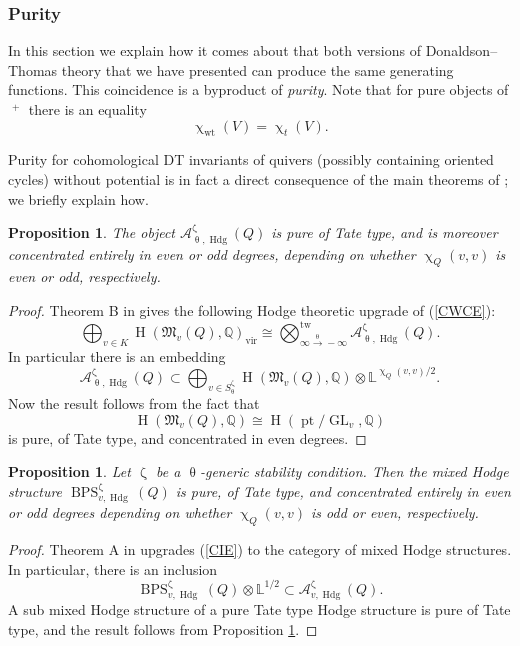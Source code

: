 \documentclass{amsart}
\DeclareMathOperator{\tw}{tw}
\DeclareMathOperator{\pt}{pt}
\newcommand{\Mst}{\mathfrak{M}}
\newcommand{\LL}{\mathbb{L}}
\newcommand{\QQ}{\mathbb{Q}}
\DeclareMathOperator{\Wt}{wt}
\DeclareMathOperator{\HO}{H}
\DeclareMathOperator{\mMHS}{\overline{MHS}}
\DeclareMathOperator{\BPS}{BPS}
\DeclareMathOperator{\vir}{vir}
\DeclareMathOperator{\GL}{GL}
\DeclareMathOperator{\Hodge}{Hdg}
\renewcommand{\theta}{\uptheta}
\renewcommand{\zeta}{\upzeta}
\renewcommand{\chi}{\upchi}
\theoremstyle{plain}%
\newtheorem{prop}[thm]{Proposition}
\theoremstyle{definition}
\theoremstyle{remark}
\begin{document}
\subsubsection{Purity}
In this section we explain how it comes about that both versions of Donaldson--Thomas theory that we have presented can produce the same generating functions.  This coincidence is a byproduct of \textit{purity}.  Note that for pure objects of $\mMHS^+$ there is an equality
\[
\chi_{\Wt}(V)=\chi_t(V).
\]

Purity for cohomological DT invariants of quivers (possibly containing oriented cycles) without potential is in fact a direct consequence of the main theorems of \cite{DavMei}; we briefly explain how.


\begin{prop}\label{Apurity}
The object $\mathcal{A}_{\theta,\Hodge}^{\zeta}(Q)$ is pure of Tate type, and is moreover concentrated entirely in even or odd degrees, depending on whether $\chi_Q(v,v)$ is even or odd, respectively.
\end{prop}
\begin{proof}
Theorem B in \cite{DavMei} gives the following Hodge theoretic upgrade of (\ref{CWCE}):
\[
\bigoplus_{v\in K}\HO(\Mst_v(Q),\QQ)_{\vir}\cong \bigotimes^{\tw}_{\infty \xrightarrow{\theta}-\infty}\mathcal{A}^{\zeta}_{\theta,\Hodge}(Q).
\]
In particular there is an embedding
\[
\mathcal{A}_{\theta,\Hodge}^{\zeta}(Q)\subset \bigoplus_{v\in S_{\theta}^{\zeta}}\HO(\Mst_v(Q),\QQ)\otimes \LL^{\chi_Q(v,v)/2}.
\]
Now the result follows from the fact that 
\[
\HO(\Mst_v(Q),\mathbb{Q})\cong \HO(\pt/\GL_v,\QQ)
\]
is pure, of Tate type, and concentrated in even degrees.
\end{proof}
\begin{prop}
Let $\zeta$ be a $\theta$-generic stability condition.  Then the mixed Hodge structure $\BPS_{v,\Hodge}^{\zeta}(Q)$ is pure, of Tate type, and concentrated entirely in even or odd degrees depending on whether $\chi_Q(v,v)$ is odd or even, respectively. 
\end{prop}
\begin{proof}
Theorem A in \cite{DavMei} upgrades (\ref{CIE}) to the category of mixed Hodge structures.  In particular, there is an inclusion
\[
\BPS_{v,\Hodge}^{\zeta}(Q)\otimes\LL^{1/2}\subset \mathcal{A}_{v,\Hodge}^{\zeta}(Q).
\]
A sub mixed Hodge structure of a pure Tate type Hodge structure is pure of Tate type, and the result follows from Proposition \ref{Apurity}.
\end{proof}
\end{document}

